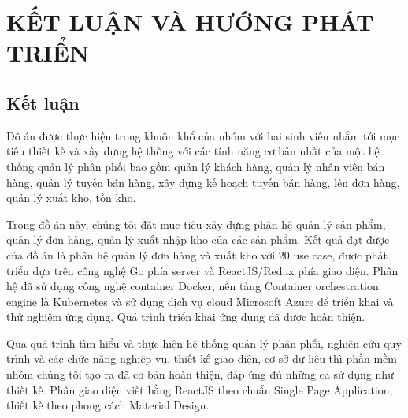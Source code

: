 \chapter{KẾT LUẬN VÀ HƯỚNG PHÁT TRIỂN}
\section{Kết luận}
Đồ án được thực hiện trong khuôn khổ của nhóm với hai sinh viên
nhắm tới mục tiêu thiết kế và xây dựng hệ thống với các tính năng
cơ bản nhất của một hệ thống quản lý phân phối bao gồm quản lý
khách hàng, quản lý nhân viên bán hàng, quản lý tuyến bán hàng,
xây dựng kế hoạch tuyến bán hàng, lên đơn hàng, quản lý xuất kho,
tồn kho.

Trong đồ án này, chúng tôi đặt mục tiêu xây dựng phân hệ
quản lý sản phẩm, quản lý đơn hàng, quản lý xuất nhập kho
của các sản phẩm. Kết quả đạt được của đồ án là phân hệ
quản lý đơn hàng và xuất kho với 20 use case, được phát triển
dựa trên công nghệ Go phía server và ReactJS/Redux phía giao
diện. Phân hệ đã sử dụng công nghệ container Docker,
nền tảng Container orchestration engine là Kubernetes và
sử dụng dịch vụ cloud Microsoft Azure để triển khai
và thử nghiệm ứng dụng. Quá trình triển khai ứng dụng đã
được hoàn thiện.

Qua quá trình tìm hiểu và thực hiện hệ thống quản lý phân phối,
nghiên cứu quy trình và các chức năng nghiệp vụ, thiết kế giao
diện, cơ sở dữ liệu thì phần mềm nhóm chúng tôi tạo ra đã cơ bản hoàn
thiện, đáp ứng đủ những ca sử dụng như thiết kế. Phần giao diện
viết bằng ReactJS theo chuẩn Single Page Application, thiết kế theo
phong cách Material Design. 

